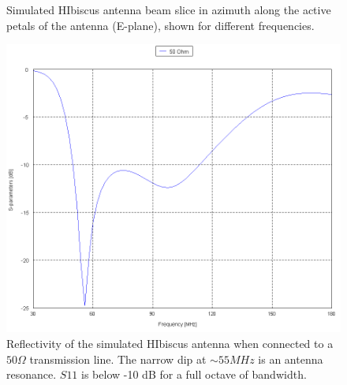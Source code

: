 \begin{figure}[htb]
\begin{minipage}[b]{0.47\textwidth}
\caption{Simulated HIbiscus antenna beam slice in azimuth along the active petals of the antenna (E-plane), shown for different frequencies.}
\label{Fig:HIsym_beam_2}
\end{minipage}
\end{figure}
 
\begin{figure}[htb]
\centering
\begin{minipage}[b]{0.49\textwidth}
\centering
\includegraphics[width=0.95\linewidth]{SCIHI_system/figures/HIbiscus_S11_50_Cart.png}
\caption{Reflectivity of the simulated HIbiscus antenna when connected to a $50 \Omega$ transmission line. The narrow dip at $\sim 55 MHz$ is an antenna resonance. $S11$ is below -10 dB for a full octave of bandwidth.}
\label{Fig:HIsim_S11_dB}
\end{minipage}%
\begin{minipage}[b]{0.02\textwidth}
\hspace{1cm}
\end{minipage}%
\begin{minipage}[b]{0.46\textwidth}
\centering

\end{minipage}
\end{figure}
